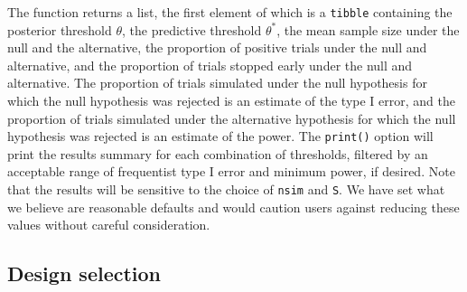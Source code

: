 The function returns a list, the first element of which is a
\texttt{tibble} containing the posterior threshold \(\theta\), the
predictive threshold \(\theta^*\), the mean sample size under the null
and the alternative, the proportion of positive trials under the null
and alternative, and the proportion of trials stopped early under the
null and alternative. The proportion of trials simulated under the null
hypothesis for which the null hypothesis was rejected is an estimate of
the type I error, and the proportion of trials simulated under the
alternative hypothesis for which the null hypothesis was rejected is an
estimate of the power. The \texttt{print()} option will print the
results summary for each combination of thresholds, filtered by an
acceptable range of frequentist type I error and minimum power, if
desired. Note that the results will be sensitive to the choice of
\texttt{nsim} and \texttt{S}. We have set what we believe are reasonable
defaults and would caution users against reducing these values without
careful consideration.

\hypertarget{design-selection}{%
\subsection{Design selection}\label{design-selection}}

